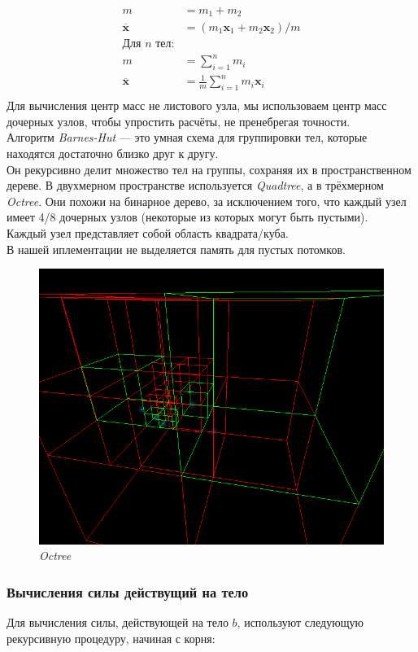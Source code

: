 \documentclass{article}
\begin{document}
\begin{align*}
  m &= m_1 + m_2\\
  \overline{\mathbf{x}} &= (m_1\mathbf{x}_1 + m_2\mathbf{x}_2) / m\\
  \text{Для $n$ тел:}&\\
  m &= \sum^{n}_{i = 1}{m_i}\\
  \overline{\mathbf{x}} &= \frac{1}{m}\sum^{n}_{i = 1}{m_i\mathbf{x}_i}\\
\end{align*}
Для вычисления центр масс не листового узла, мы использоваем центр масс дочерных узлов, чтобы упростить расчёты, не пренебрегая точности.\\[\baselineskip]
Алгоритм \textit{Barnes-Hut} --- это умная схема для группировки тел, которые находятся достаточно близко друг к другу.\\
Он рекурсивно делит множество тел на группы, сохраняя их в пространственном дереве.
В двухмерном пространстве используется \textit{Quadtree}, а в трёхмерном \textit{Octree}. Они похожи на бинарное дерево, за исключением того, что каждый узел имеет 4/8 дочерных узлов (некоторые из которых могут быть пустыми).\\
Каждый узел представляет собой область квадрата/куба.\\
В нашей иплементации не выделяется память для пустых потомков.\\

\begin{figure}[H]
  \centering
  \includegraphics[width=0.7\linewidth]{../images/octree2.png}
  \caption{\textit{Octree}}
  \label{fig:octree}
\end{figure}

\subsubsection*{Вычисления силы действущий на тело}
Для вычисления силы, действующей на тело $b$, используют следующую рекурсивную процедуру, начиная с корня:
\end{document}
